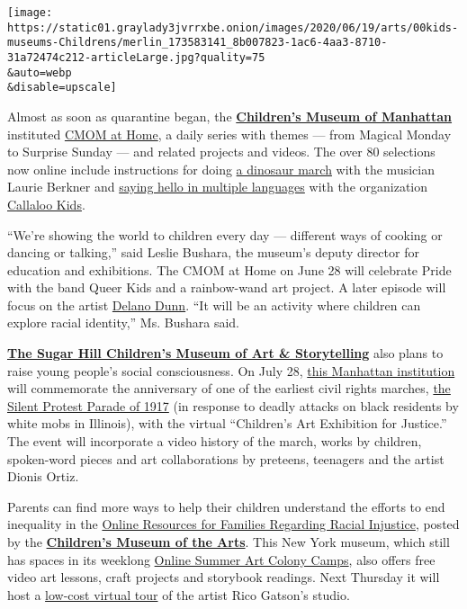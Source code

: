 \texttt{[image: https://static01.graylady3jvrrxbe.onion/images/2020/06/19/arts/00kids-museums-Childrens/merlin\_173583141\_8b007823-1ac6-4aa3-8710-31a72474c212-articleLarge.jpg?quality=75\\\&auto=webp\\\&disable=upscale]}

Almost as soon as quarantine began, the
\textbf{\href{https://cmom.org/}{Children's Museum of Manhattan}}
instituted \href{https://athome.cmom.org/}{CMOM at Home}, a daily series
with themes --- from Magical Monday to Surprise Sunday --- and related
projects and videos. The over 80 selections now online include
instructions for doing
\href{https://athome.cmom.org/join-the-dinosaur-march-with-laurie-berkner/}{a
dinosaur march} with the musician Laurie Berkner and
\href{https://athome.cmom.org/ways-to-say-hello-with-mumu-fresh-and-callaloo-kids/}{saying
hello in multiple languages} with the organization
\href{http://www.callalookids.com/}{Callaloo Kids}.

``We're showing the world to children every day --- different ways of
cooking or dancing or talking,'' said Leslie Bushara, the museum's
deputy director for education and exhibitions. The CMOM at Home on June
28 will celebrate Pride with the band Queer Kids and a rainbow-wand art
project. A later episode will focus on the artist
\href{https://www.youtube.com/watch?v=A90E3QuF0Hw}{Delano Dunn}. ``It
will be an activity where children can explore racial identity,'' Ms.
Bushara said.

\textbf{\href{https://www.sugarhillmuseum.org/}{The Sugar Hill
Children's Museum of Art \& Storytelling}} also plans to raise young
people's social consciousness. On July 28,
\href{https://www.nytimes3xbfgragh.onion/2018/10/25/arts/design/sugar-hill-museum-art-to-new-yorks-youngest.html}{this
Manhattan institution} will commemorate the anniversary of one of the
earliest civil rights marches,
\href{https://naacp.org/silent-protest-parade-centennial/}{the Silent
Protest Parade of 1917} (in response to deadly attacks on black
residents by white mobs in Illinois), with the virtual ``Children's Art
Exhibition for Justice.'' The event will incorporate a video history of
the march, works by children, spoken-word pieces and art collaborations
by preteens, teenagers and the artist Dionis Ortiz.

Parents can find more ways to help their children understand the efforts
to end inequality in the
\href{https://cmany.org/blog/view/online-resources-families-regarding-racial-injustice/}{Online
Resources for Families Regarding Racial Injustice}, posted by the
\textbf{\href{https://cmany.org/}{Children's Museum of the Arts}}. This
New York museum, which still has spaces in its weeklong
\href{https://cmany.org/classes-and-activities/art-colony/summer-103-charlton/}{Online
Summer Art Colony Camps}, also offers free video art lessons, craft
projects and storybook readings. Next Thursday it will host a
\href{https://cmany.org/classes-and-activities/events/rico-gatson-virtual-studio-tour/}{low-cost
virtual tour} of the artist Rico Gatson's studio.

